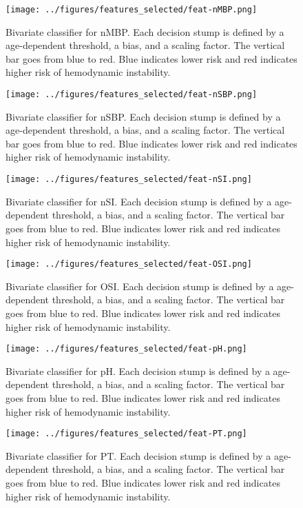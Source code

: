 \documentclass[
   technote
]{phildoc}
\begin{document}
\begin{figure}[h!]
	\centering
	\texttt{[image: ../figures/features\_selected/feat-nMBP.png]}
	\caption{Bivariate classifier for nMBP. Each decision stump is defined by a age-dependent threshold, a bias, and a scaling factor. The vertical bar goes from blue to red. Blue indicates lower risk and red indicates higher risk of hemodynamic instability.}      
\end{figure}

\begin{figure}[h!]
	\centering
	\texttt{[image: ../figures/features\_selected/feat-nSBP.png]}
	\caption{Bivariate classifier for nSBP. Each decision stump is defined by a age-dependent threshold, a bias, and a scaling factor. The vertical bar goes from blue to red. Blue indicates lower risk and red indicates higher risk of hemodynamic instability.}      
\end{figure}

\begin{figure}[h!]
	\centering
	\texttt{[image: ../figures/features\_selected/feat-nSI.png]}
	\caption{Bivariate classifier for nSI. Each decision stump is defined by a age-dependent threshold, a bias, and a scaling factor. The vertical bar goes from blue to red. Blue indicates lower risk and red indicates higher risk of hemodynamic instability.}      
\end{figure}

\clearpage

\begin{figure}[h!]
	\centering
	\texttt{[image: ../figures/features\_selected/feat-OSI.png]}
	\caption{Bivariate classifier for OSI. Each decision stump is defined by a age-dependent threshold, a bias, and a scaling factor. The vertical bar goes from blue to red. Blue indicates lower risk and red indicates higher risk of hemodynamic instability.}      
\end{figure}

\begin{figure}[h!]
	\centering
	\texttt{[image: ../figures/features\_selected/feat-pH.png]}
	\caption{Bivariate classifier for pH. Each decision stump is defined by a age-dependent threshold, a bias, and a scaling factor. The vertical bar goes from blue to red. Blue indicates lower risk and red indicates higher risk of hemodynamic instability.}      
\end{figure}

\begin{figure}[h!]
	\centering
	\texttt{[image: ../figures/features\_selected/feat-PT.png]}
	\caption{Bivariate classifier for PT. Each decision stump is defined by a age-dependent threshold, a bias, and a scaling factor. The vertical bar goes from blue to red. Blue indicates lower risk and red indicates higher risk of hemodynamic instability.}      
\end{figure}
\end{document}
